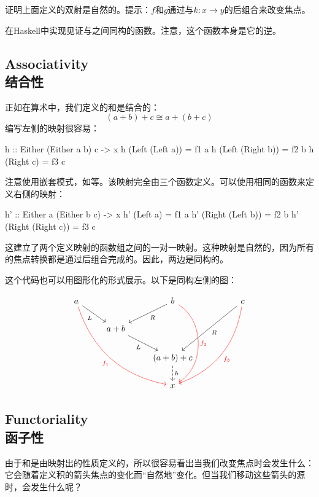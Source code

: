 \documentclass[DaoFP]{subfiles}
\begin{document}
 \begin{exercise}
  证明上面定义的双射是自然的。提示：$f$和$g$通过与$k \colon x \to y$的后组合来改变焦点。
 \end{exercise}

 \begin{exercise}
  在Haskell中实现见证与之间同构的函数。注意，这个函数本身是它的逆。
 \end{exercise}

 \subsection{Associativity\\结合性}

 正如在算术中，我们定义的和是结合的：
 \[(a + b) + c \cong a + (b + c)\]
 编写左侧的映射很容易：
 \begin{haskell}
  h :: Either (Either a b) c -> x
  h (Left (Left a))  = f1 a
  h (Left (Right b)) = f2 b
  h (Right c)        = f3 c
 \end{haskell}
 注意使用嵌套模式，如等。该映射完全由三个函数定义。可以使用相同的函数来定义右侧的映射：
 \begin{haskell}
  h' :: Either a (Either b c) -> x
  h' (Left a)          = f1 a
  h' (Right (Left b))  = f2 b
  h' (Right (Right c)) = f3 c
 \end{haskell}
 这建立了两个定义映射的函数组之间的一对一映射。这种映射是自然的，因为所有的焦点转换都是通过后组合完成的。因此，两边是同构的。

 这个代码也可以用图形化的形式展示。以下是同构左侧的图：

 \[
  \begin{tikzcd}
   a
   \arrow[rd, "L"']
   \arrow[rrddd, bend right, red, "f_1"']
   && b
   \arrow[ld, "R"]
   \arrow[ddd, bend left=60, red, "f_2"]
   &&c
   \arrow[lldd, "R"]
   \arrow[llddd, bend left, red, "f_3"]
   \\
   & a + b
   \arrow[rd, "L"']
   \\
   &&(a + b) + c
   \arrow[d, dashed, "h"]
   \\
   && x
  \end{tikzcd}
 \]

 \subsection{Functoriality\\函子性}

 由于和是由映射出的性质定义的，所以很容易看出当我们改变焦点时会发生什么：它会随着定义积的箭头焦点的变化而“自然地”变化。但当我们移动这些箭头的源时，会发生什么呢？
\end{document}

